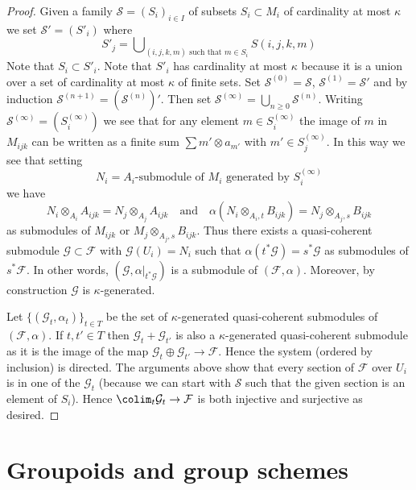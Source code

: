 \begin{proof}
\medskip\noindent
Given a family $\mathcal{S} = (S_i)_{i \in I}$ of subsets
$S_i \subset M_i$ of cardinality at most $\kappa$ we set
$\mathcal{S}' = (S'_i)$ where
$$
S'_j = \bigcup\nolimits_{(i, j, k, m)\text{ such that }m \in S_i}
S(i, j, k, m)
$$
Note that $S_i \subset S'_i$. Note that $S'_i$ has cardinality at most
$\kappa$ because it is a union over a set of cardinality at most $\kappa$
of finite sets. Set $\mathcal{S}^{(0)} = \mathcal{S}$,
$\mathcal{S}^{(1)} = \mathcal{S}'$ and by induction
$\mathcal{S}^{(n + 1)} = (\mathcal{S}^{(n)})'$. Then set
$\mathcal{S}^{(\infty)} = \bigcup_{n \geq 0} \mathcal{S}^{(n)}$.
Writing $\mathcal{S}^{(\infty)} = (S^{(\infty)}_i)$ we see that
for any element $m \in S^{(\infty)}_i$ the image of $m$ in
$M_{ijk}$ can be written as a finite sum $\sum m' \otimes a_{m'}$
with $m' \in S_j^{(\infty)}$. In this way we see that setting
$$
N_i = A_i\text{-submodule of }M_i\text{ generated by }S^{(\infty)}_i
$$
we have
$$
N_i \otimes_{A_i} A_{ijk} = N_j \otimes_{A_j} A_{ijk}
\quad\text{and}\quad
\alpha(N_i \otimes_{A_i, t} B_{ijk}) = N_j \otimes_{A_j, s} B_{ijk}
$$
as submodules of $M_{ijk}$ or $M_j \otimes_{A_j, s} B_{ijk}$.
Thus there exists a quasi-coherent submodule
$\mathcal{G} \subset \mathcal{F}$ with $\mathcal{G}(U_i) = N_i$
such that $\alpha(t^*\mathcal{G}) = s^*\mathcal{G}$ as submodules
of $s^*\mathcal{F}$. In other words,
$(\mathcal{G}, \alpha|_{t^*\mathcal{G}})$ is a submodule of
$(\mathcal{F}, \alpha)$.
Moreover, by construction $\mathcal{G}$ is $\kappa$-generated.

\medskip\noindent
Let $\{(\mathcal{G}_t, \alpha_t)\}_{t \in T}$ be the set of
$\kappa$-generated quasi-coherent submodules of $(\mathcal{F}, \alpha)$.
If $t, t' \in T$ then $\mathcal{G}_t + \mathcal{G}_{t'}$ is also a
$\kappa$-generated quasi-coherent submodule as it is the image of the map
$\mathcal{G}_t \oplus \mathcal{G}_{t'} \to \mathcal{F}$.
Hence the system (ordered by inclusion) is directed.
The arguments above show that every section of $\mathcal{F}$ over $U_i$
is in one of the $\mathcal{G}_t$ (because we can start with $\mathcal{S}$
such that the given section is an element of $S_i$). Hence
$\colim_t \mathcal{G}_t \to \mathcal{F}$ is both injective and surjective
as desired.
\end{proof}





\section{Groupoids and group schemes}
\label{section-groupoids-group-schemes}

